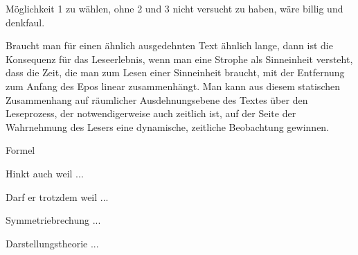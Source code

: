 Möglichkeit 1 zu wählen, ohne 2 und 3 nicht versucht zu haben, wäre billig und
  denkfaul.

Braucht man für einen ähnlich ausgedehnten Text ähnlich lange, dann ist die
  Konsequenz für das Leseerlebnis, wenn man eine Strophe als Sinneinheit
  versteht, dass die Zeit, die man zum Lesen einer Sinneinheit braucht, mit der
  Entfernung zum Anfang des Epos linear zusammenhängt.
Man kann aus diesem statischen Zusammenhang auf räumlicher Ausdehnungsebene
  des Textes über den Leseprozess, der notwendigerweise auch zeitlich ist, auf
  der Seite der Wahrnehmung des Lesers eine dynamische, zeitliche Beobachtung
  gewinnen.

  Formel

Hinkt auch weil ...

Darf er trotzdem weil ...

Symmetriebrechung ...

Darstellungstheorie ...
